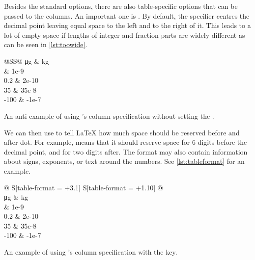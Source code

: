 Besides the standard options, there are also table-specific options that can be
passed to the columns. An important one is . By default, the
 specifier centres the decimal point leaving equal space to the left
and to the right of it. This leads to a lot of empty space if lengths of
integer and fraction parts are widely different as can be seen in
\autoref{lst:toowide}.
\begin{listing}
  \begin{example}[examplewidth=0.7\linewidth, vertical_mode]
\begin{tabular} {@{}SS@{}}
  \toprule
  {\unit{\ug}} & {\unit{\kg}} \\
   & 1e-9 \\
  0.2 & 2e-10 \\
  35 & 35e-8 \\
  -100 & -1e-7 \\
  \bottomrule
\end{tabular}
\end{example}
  \caption{An anti-example of using 's  column
    specification without setting the .}\label{lst:toowide}
\end{listing}
We can then use
 to tell \LaTeX{} how much space should be reserved
before and after dot. For example,  means that it should reserve
space for 6 digits before the decimal point, and for two digits after. The
format may also contain information about signs, exponents, or text around
the numbers. See \autoref{lst:tableformat} for an example.
\begin{listing}
  \begin{example}[examplewidth=0.7\linewidth, vertical_mode]
\begin{tabular} {
    @{}
    S[table-format = +3.1]
    S[table-format = +1.10]
    @{}
  }
  \toprule
   \\
  \midrule
  {\unit{\ug}} & {\unit{\kg}} \\
   & 1e-9 \\
  0.2 & 2e-10 \\
  35 & 35e-8 \\
  -100 & -1e-7 \\
  \bottomrule
\end{tabular}
\end{example}
  \caption{An example of using 's  column
    specification with the  key.}\label{lst:tableformat}
\end{listing}

